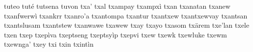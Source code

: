 tuteo\hspace{2mm}
tuté\hspace{2mm}
tutsena\hspace{2mm}
tuvon\hspace{2mm}
txa'\hspace{2mm}
txal\hspace{2mm}
txampay\hspace{2mm}
txampxì\hspace{2mm}
txan\hspace{2mm}
txanatan\hspace{2mm}
txanew\hspace{2mm}
txanfwerwì\hspace{2mm}
txankrr\hspace{2mm}
txanro'a\hspace{2mm}
txantompa\hspace{2mm}
txantur\hspace{2mm}
txantxew\hspace{2mm}
txantxewvay\hspace{2mm}
txantsan\hspace{2mm}
txantslusam\hspace{2mm}
txantstew\hspace{2mm}
txanwawe\hspace{2mm}
txawew\hspace{2mm}
txay\hspace{2mm}
txayo\hspace{2mm}
txasom\hspace{2mm}
txärem\hspace{2mm}
txe'lan\hspace{2mm}
txele\hspace{2mm}
txen\hspace{2mm}
txep\hspace{2mm}
txepìva\hspace{2mm}
txeptseng\hspace{2mm}
txeptsyìp\hspace{2mm}
txepvi\hspace{2mm}
txew\hspace{2mm}
txewk\hspace{2mm}
txewluke\hspace{2mm}
txewm\hspace{2mm}
txewnga'\hspace{2mm}
txey\hspace{2mm}
txi\hspace{2mm}
txin\hspace{2mm}
txintìn\hspace{2mm}
